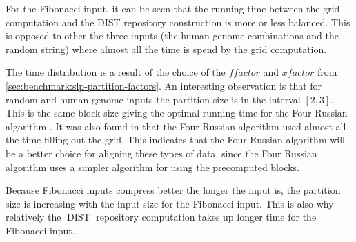 \documentclass[twoside,11pt,openright]{report}
\newcommand{\DIST}{\operatorname{DIST}}
\begin{document}
For the Fibonacci input, it can be seen that the running time between the grid computation and the DIST repository construction is more or less balanced. This is opposed to other the three inputs (the human genome combinations and the random string) where almost all the time is spend by the grid computation.

The time distribution is a result of the choice of the $ffactor$ and $xfactor$ from \cref{sec:benchmark:slp-partition-factors}. An interesting observation is that for random and human genome inputs the partition size is in the interval $[2, 3]$. This is the same block size giving the optimal running time for the Four Russian algorithm \cite{LasseFourRussian}. It was also found in \cite{LasseFourRussian} that the Four Russian algorithm used almost all the time filling out the grid. This indicates that the Four Russian algorithm will be a better choice for aligning these types of data, since the Four Russian algorithm uses a simpler algorithm for using the precomputed blocks.

Because Fibonacci inputs compress better the longer the input is, the partition size is increasing with the input size for the Fibonacci input. This is also why relatively the $\DIST$ repository computation takes up longer time for the Fibonacci input.
\end{document}
